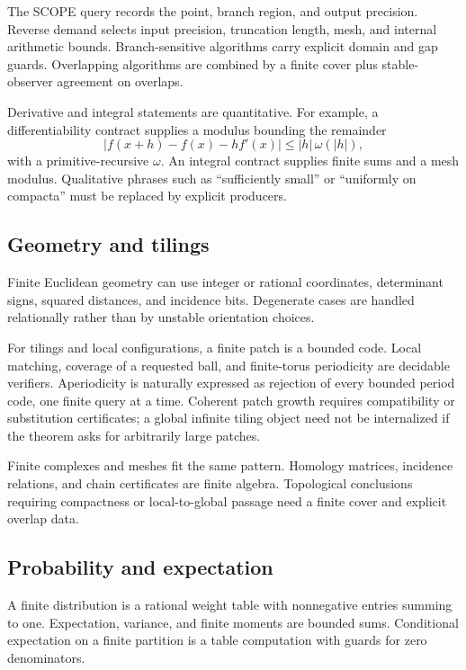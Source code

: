 The SCOPE query records the point, branch region, and output precision.  Reverse demand selects input precision, truncation length, mesh, and internal arithmetic bounds.  Branch-sensitive algorithms carry explicit domain and gap guards.  Overlapping algorithms are combined by a finite cover plus stable-observer agreement on overlaps.

Derivative and integral statements are quantitative.  For example, a differentiability contract supplies a modulus bounding the remainder
\[
  |f(x+h)-f(x)-h f'(x)|\le |h|\,\omega(|h|),
\]
with a primitive-recursive \(\omega\).  An integral contract supplies finite sums and a mesh modulus.  Qualitative phrases such as ``sufficiently small'' or ``uniformly on compacta'' must be replaced by explicit producers.

\subsection{Geometry and tilings}

Finite Euclidean geometry can use integer or rational coordinates, determinant signs, squared distances, and incidence bits.  Degenerate cases are handled relationally rather than by unstable orientation choices.

For tilings and local configurations, a finite patch is a bounded code.  Local matching, coverage of a requested ball, and finite-torus periodicity are decidable verifiers.  Aperiodicity is naturally expressed as rejection of every bounded period code, one finite query at a time.  Coherent patch growth requires compatibility or substitution certificates; a global infinite tiling object need not be internalized if the theorem asks for arbitrarily large patches.

Finite complexes and meshes fit the same pattern.  Homology matrices, incidence relations, and chain certificates are finite algebra.  Topological conclusions requiring compactness or local-to-global passage need a finite cover and explicit overlap data.

\subsection{Probability and expectation}

A finite distribution is a rational weight table with nonnegative entries summing to one.  Expectation, variance, and finite moments are bounded sums.  Conditional expectation on a finite partition is a table computation with guards for zero denominators.

